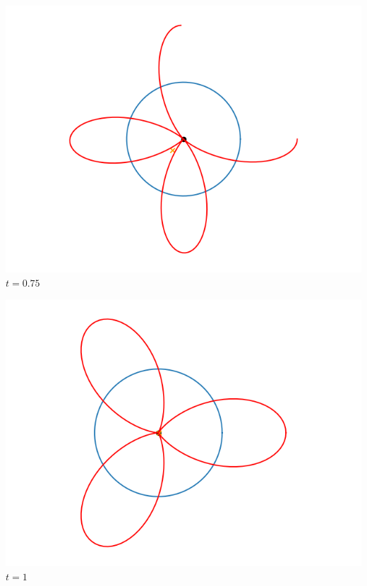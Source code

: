 \documentclass[11pt,class=report,crop=false]{standalone}
\begin{document}
\begin{center}
\begin{minipage}{0.24\textwidth}
	\center \includegraphics[scale=\myscale,scale=0.3]{figures/fourier-6-075}
	$t = 0.75$ 
	\end{minipage}
	\begin{minipage}{0.24\textwidth}
	\center \includegraphics[scale=\myscale,scale=0.3]{figures/fourier-6-100}
	$t = 1$ 
	\end{minipage}



\end{center}
\end{document}
